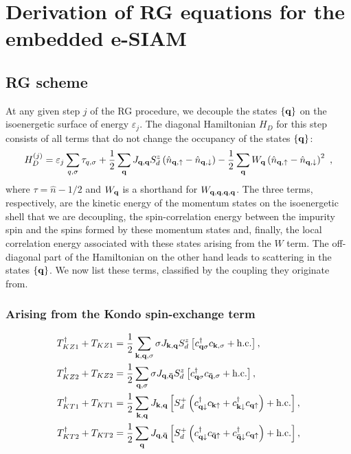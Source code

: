 \documentclass[reprint,hidelinks,onecolumn]{revtex4-2}
\begin{document}
\section{Derivation of RG equations for the embedded e-SIAM}
\subsection{RG scheme}
At any given step \(j\) of the RG procedure, we decouple the states \(\left\{ {\bf q} \right\} \) on the isoenergetic surface of energy \(\varepsilon_j\). The diagonal Hamiltonian \(H_D\) for this step consists of all terms that do not change the occupancy of the states \(\left\{{\bf q}\right\}\):
\begin{equation}\begin{aligned}
	H_D^{(j)} = \varepsilon_j\sum_{q,\sigma}\tau_{q,\sigma} + \frac{1}{2}\sum_{{\bf q}}J_{{\bf q}, {\bf q}}S_d^z\left(\hat n_{{\bf q}, \uparrow} - \hat n_{{\bf q}, \downarrow}\right) - \frac{1}{2}\sum_{{\bf q}}W_{\bf q}\left(\hat n_{{\bf q}, \uparrow} - \hat n_{{\bf q}, \downarrow}\right)^2~,
\end{aligned}\end{equation}
where \(\tau = \hat n - 1/2\) and \(W_{{\bf q}}\) is a shorthand for \(W_{{\bf q},{\bf q},{\bf q},{\bf q}}\). The three terms, respectively, are the kinetic energy of the momentum states on the isoenergetic shell that we are decoupling, the spin-correlation energy between the impurity spin and the spins formed by these momentum states and, finally, the local correlation energy associated with these states arising from the \(W\) term. The off-diagonal part of the Hamiltonian on the other hand leads to scattering in the states \(\left\{ {\bf q} \right\} \). We now list these terms, classified by the coupling they originate from.

\subsubsection*{Arising from the Kondo spin-exchange term}
\begin{equation}\begin{aligned}
	T_{KZ1}^\dagger + T_{KZ1} &= \frac{1}{2}\sum_{{\bf k}, {\bf q}, \sigma}\sigma J_{{\bf k}, {\bf q}} S_d^z  \left[c^\dagger_{{\bf q}\sigma}c_{{\bf k},\sigma} + \text{h.c.}\right],\\
	T_{KZ2}^\dagger + T_{KZ2} &= \frac{1}{2}\sum_{{\bf q}, \sigma}\sigma J_{{\bf q}, {\bf \bar q}} S_d^z  \left[c^\dagger_{{\bf q}\sigma}c_{{\bf \bar q},\sigma} + \text{h.c.}\right],\\
	T_{KT1}^\dagger + T_{KT1} &= \frac{1}{2}\sum_{{\bf k}, {\bf q}}J_{{\bf k}, {\bf q}} \left[S_d^+\left(c^\dagger_{{\bf q}\downarrow}c_{{\bf k}\uparrow} + c^\dagger_{{\bf k}\downarrow}c_{{\bf q}\uparrow}\right) + \text{h.c.}\right],\\
	T_{KT2}^\dagger + T_{KT2} &= \frac{1}{2}\sum_{{\bf q}}J_{{\bf q}, {\bf \bar q}} \left[S_d^+\left(c^\dagger_{{\bf q}\downarrow}c_{{\bf \bar q}\uparrow} + c^\dagger_{{\bf \bar q}\downarrow}c_{{\bf q}\uparrow}\right) + \text{h.c.}\right],\\
\end{aligned}\end{equation}
\end{document}
